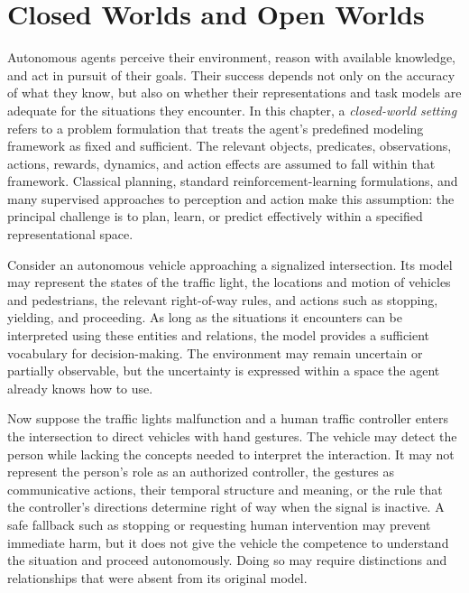 \section{Closed Worlds and Open Worlds}
\label{sec:closed_worlds_open_worlds}

Autonomous agents perceive their environment, reason with available knowledge, and act in pursuit of their goals.
Their success depends not only on the accuracy of what they know, but also on whether their representations and task models are adequate for the situations they encounter.
In this chapter, a \emph{closed-world setting} refers to a problem formulation that treats the agent's predefined modeling framework as fixed and sufficient.
The relevant objects, predicates, observations, actions, rewards, dynamics, and action effects are assumed to fall within that framework.
Classical planning, standard reinforcement-learning formulations, and many supervised approaches to perception and action make this assumption: the principal challenge is to plan, learn, or predict effectively within a specified representational space.

Consider an autonomous vehicle approaching a signalized intersection.
Its model may represent the states of the traffic light, the locations and motion of vehicles and pedestrians, the relevant right-of-way rules, and actions such as stopping, yielding, and proceeding.
As long as the situations it encounters can be interpreted using these entities and relations, the model provides a sufficient vocabulary for decision-making.
The environment may remain uncertain or partially observable, but the uncertainty is expressed within a space the agent already knows how to use.

Now suppose the traffic lights malfunction and a human traffic controller enters the intersection to direct vehicles with hand gestures.
The vehicle may detect the person while lacking the concepts needed to interpret the interaction.
It may not represent the person's role as an authorized controller, the gestures as communicative actions, their temporal structure and meaning, or the rule that the controller's directions determine right of way when the signal is inactive.
A safe fallback such as stopping or requesting human intervention may prevent immediate harm, but it does not give the vehicle the competence to understand the situation and proceed autonomously.
Doing so may require distinctions and relationships that were absent from its original model.

